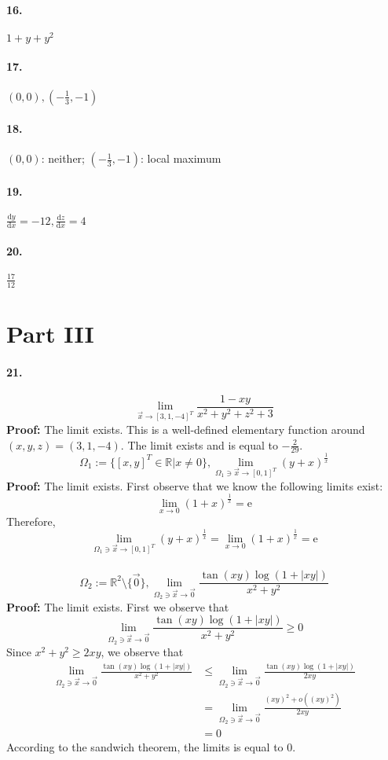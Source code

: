 \documentclass[11pt, a4paper]{article}
\begin{document}
\paragraph{16.} $1 + y + y^2$
\paragraph{17.} $(0, 0), (-\frac{1}{3}, -1)$
\paragraph{18.} $(0, 0)$: neither; $(-\frac{1}{3}, -1)$: local maximum
\paragraph{19.} $\frac{\mathrm{d}y}{\mathrm{d}x} = -12, \frac{\mathrm{d}z}{\mathrm{d}x} = 4$
\paragraph{20.} $\frac{17}{12}$

\section*{Part III}
\paragraph{21.}
$$\lim\limits_{\vec{x} \to [3, 1, -4]^T} \frac{1 - xy}{x^2 + y^2 + z^2 + 3}$$
\textbf{Proof:} The limit exists. This is a well-defined elementary function around $(x, y, z) = (3, 1, -4)$. The limit exists and is equal to $-\frac{2}{29}$. \\
$$\Omega_1 := \{[x, y]^T \in \mathbb{R}|x \neq 0\}, \lim\limits_{\Omega_1 \ni \vec{x} \to [0, 1]^T} (y + x) ^ \frac{1}{x}$$ 
\textbf{Proof:} The limit exists. First observe that we know the following limits exist:
$$\lim\limits_{x \to 0} (1 + x) ^\frac{1}{x} = \mathrm{e}$$
Therefore,
$$\lim\limits_{\Omega_1 \ni \vec{x} \to [0, 1]^T} (y + x) ^ \frac{1}{x} = \lim\limits_{x \to 0} (1 + x) ^\frac{1}{x} = \mathrm{e}$$ \\
$$\Omega_2 := \mathbb{R}^2\setminus \{\vec{0}\}, \lim\limits_{\Omega_2 \ni \vec{x} \to \vec{0}} \frac{\tan(xy)\log(1 + |xy|)}{x^2 + y^2}$$
\textbf{Proof:} The limit exists. First we observe that
$$\lim\limits_{\Omega_2 \ni \vec{x} \to \vec{0}} \frac{\tan(xy)\log(1 + |xy|)}{x^2 + y^2} \geq 0$$
Since $x^2 + y^2 \geq 2xy$, we observe that
$$\begin{aligned}
    \lim\limits_{\Omega_2 \ni \vec{x} \to \vec{0}} \frac{\tan(xy)\log(1 + |xy|)}{x^2 + y^2} &\leq \lim\limits_{\Omega_2 \ni \vec{x} \to \vec{0}} \frac{\tan(xy)\log(1 + |xy|)}{2xy} \\ 
    &= \lim\limits_{\Omega_2 \ni \vec{x} \to \vec{0}} \frac{(xy)^2 + o((xy)^2)}{2xy} \\
    &= 0 
\end{aligned}$$
According to the sandwich theorem, the limits is equal to 0.
\end{document}
